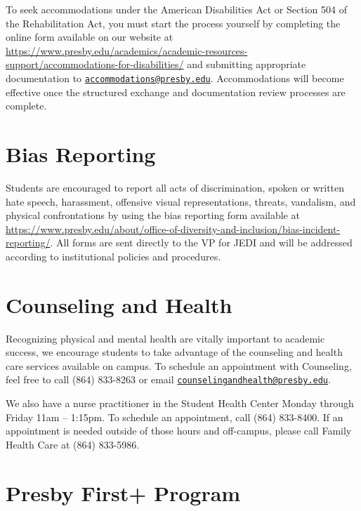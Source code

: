 \documentclass[
]{book}
\begin{document}
To seek accommodations under the American Disabilities Act or Section 504 of the Rehabilitation Act, you must start the process yourself by completing the online form available on our website at \url{https://www.presby.edu/academics/academic-resources-support/accommodations-for-disabilities/} and submitting appropriate documentation to \href{mailto:accommodations@presby.edu}{\nolinkurl{accommodations@presby.edu}}. Accommodations will become effective once the structured exchange and documentation review processes are complete.

\hypertarget{bias-reporting}{%
\section{Bias Reporting}\label{bias-reporting}}

Students are encouraged to report all acts of discrimination, spoken or written hate speech, harassment, offensive visual representations, threats, vandalism, and physical confrontations by using the bias reporting form available at \url{https://www.presby.edu/about/office-of-diversity-and-inclusion/bias-incident-reporting/}. All forms are sent directly to the VP for JEDI and will be addressed according to institutional policies and procedures.

\hypertarget{counseling-and-health}{%
\section{Counseling and Health}\label{counseling-and-health}}

Recognizing physical and mental health are vitally important to academic success, we encourage students to take advantage of the counseling and health care services available on campus. To schedule an appointment with Counseling, feel free to call (864) 833-8263 or email \href{mailto:counselingandhealth@presby.edu}{\nolinkurl{counselingandhealth@presby.edu}}.

We also have a nurse practitioner in the Student Health Center Monday through Friday 11am -- 1:15pm. To schedule an appointment, call (864) 833-8400. If an appointment is needed outside of those hours and off-campus, please call Family Health Care at (864) 833-5986.

\hypertarget{presby-first-program}{%
\section{Presby First+ Program}\label{presby-first-program}}
\end{document}
